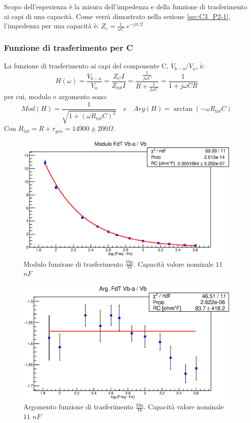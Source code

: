 Scopo dell'esperienza è la misura dell'impedenza e della funzione di trasferimento ai capi di una capacità. Come verrà dimostrato nella sezione \ref{sec:C3_P2-1}, l'impedenza per una capacità è:  $Z_c = \frac{1}{\omega C} \; e^{-j\pi/2}$
\\
%
%
\subsubsection{Funzione di trasferimento per C}
La funzione di trasferimento ai capi del componente C, $V_{b-a}/V_a$, è:
$$ H(\omega) = \frac{ V_{b-a} }{V_a} = \frac{Z_CI}{Z_{tot}I} = \frac{\frac{1}{j\omega C}}{R + \frac{1}{j\omega C}} = \frac{1}{1+j\omega CR} $$
%
per cui, modulo e argomento sono:
%
$$ Mod(H) = \frac{1}{\sqrt{ 1+(\omega R_{tot} C)^2} } \quad e \quad Arg(H) = \arctan(-\omega R_{tot}C) $$
%
Con $R_{tot} =  R + r_{gen} = 14900 \pm 200 \Omega $.
\begin{figure}[H]
    \centering
    \includegraphics[scale=.6]{Grafici/C2_P2_ModFdt1_.eps}
    \caption{
        Modulo funzione di trasferimento $ \tfrac{Vba}{Vb} $.
         Capacità valore nominale $11$ $nF$
    }
    \label{fig:C2_P2_ModFdt1}
\end{figure}
%
\begin{figure}[H]
    \centering
    \includegraphics[scale=.6]{Grafici/C2_P2_ArgFdt1_.eps}
    \caption
    {
        Argomento funzione di trasferimento $ \tfrac{Vba}{Vb} $.
        Capacità valore nominale $11$ $nF$
    }
    \label{fig:C2_P2_ArgFdt1}
\end{figure}
